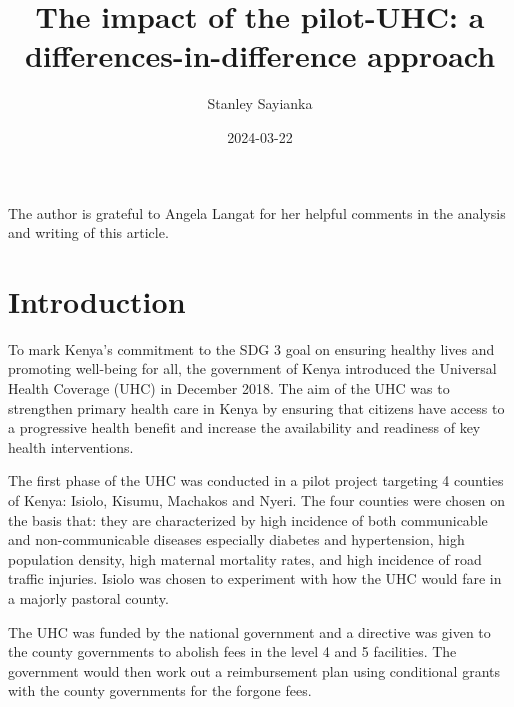 \documentclass[
  letterpaper,
  DIV=11,
  numbers=noendperiod,
  oneside]{scrartcl}
\title{The impact of the pilot-UHC: a differences-in-difference
approach}
\author{Stanley Sayianka}
\date{2024-03-22}
\begin{document}
\maketitle
\ifdefined\Shaded\renewenvironment{Shaded}{\begin{tcolorbox}[breakable, borderline west={3pt}{0pt}{shadecolor}, interior hidden, enhanced, boxrule=0pt, frame hidden, sharp corners]}{\end{tcolorbox}}\fi

The author is grateful to Angela Langat
for her helpful comments in the analysis and writing of this article.

\hypertarget{introduction}{%
\section{Introduction}\label{introduction}}

To mark Kenya's commitment to the SDG 3 goal on ensuring healthy lives
and promoting well-being for all, the government of Kenya introduced the
Universal Health Coverage (UHC) in December 2018. The aim of the UHC was to
strengthen primary health care in Kenya by ensuring that citizens have
access to a progressive health benefit and increase the availability and
readiness of key health interventions.

The first phase of the UHC was conducted in a pilot project targeting 4
counties of Kenya: Isiolo, Kisumu, Machakos and Nyeri. The four counties
were chosen on the basis that: they are characterized by high incidence
of both communicable and non-communicable diseases especially diabetes
and hypertension, high population density, high maternal mortality
rates, and high incidence of road traffic injuries. Isiolo was chosen to
experiment with how the UHC would fare in a majorly pastoral county.

The UHC was funded by the national government and a directive was given
to the county governments to abolish fees in the level 4 and 5
facilities. The government would then work out a reimbursement plan
using conditional grants with the county governments for the forgone
fees.
\end{document}
